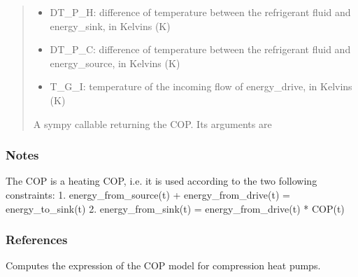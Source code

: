 \documentclass[letterpaper,10pt,english]{sphinxmanual}
\begin{document}
\begin{fulllineitems}
\begin{fulllineitems}
\begin{quote}
\begin{description}
\begin{itemize}
\item {} 
\sphinxAtStartPar
DT\_P\_H: difference of temperature between the refrigerant fluid and energy\_sink, in Kelvins (K)

\item {} 
\sphinxAtStartPar
DT\_P\_C: difference of temperature between the refrigerant fluid and energy\_source, in Kelvins (K)

\item {} 
\sphinxAtStartPar
T\_G\_I: temperature of the incoming flow of energy\_drive, in Kelvins (K)

\end{itemize}


\sphinxAtStartPar
A sympy callable returning the COP. Its arguments are

\end{description}\end{quote}
\subsubsection*{Notes}

\sphinxAtStartPar
The COP is a heating COP, i.e. it is used according to the two following constraints:
1. energy\_from\_source(t) + energy\_from\_drive(t) = energy\_to\_sink(t)
2. energy\_from\_sink(t) = energy\_from\_drive(t) * COP(t)
\subsubsection*{References}

\end{fulllineitems}


\begin{fulllineitems}
\label{\detokenize{generated/tamos.production.COPModels:tamos.production.COPModels.compression}}
\pysigstartsignatures
{}
\pysigstopsignatures
\sphinxAtStartPar
Computes the expression of the COP model for compression heat pumps.


\end{fulllineitems}
\end{fulllineitems}
\end{document}
